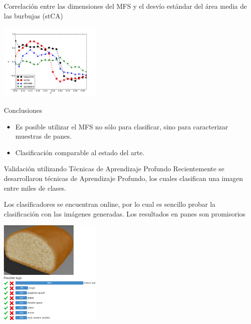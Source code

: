 \documentclass[spanish]{beamer}
\begin{document}
\begin{frame}
Correlación entre las dimensiones del MFS y el desvío estándar del área media de las burbujas (stCA)

\centerline{\includegraphics[width=5cm]{../figures/stMCA}}

\end{frame}

\begin{frame}{Conclusiones}
\begin{itemize}
\item Es posible utilizar el MFS no sólo para clasificar, sino para caracterizar muestras de panes.
\item Clasificación comparable al estado del arte.
\end{itemize}
\end{frame}


\begin{frame}{Validación utilizando Técnicas de Aprendizaje Profundo}
Recientemente se desarrollaron técnicas de Aprendizaje Profundo, los cuales clasifican una imagen entre miles de clases.

Los clasificadores se encuentran online, por lo cual es sencillo probar la clasificación con las imágenes generadas. Los resultados en panes son promisorios

\centerline{\includegraphics[width=5cm]{../figures/deep1}}

\end{frame}
\end{document}
